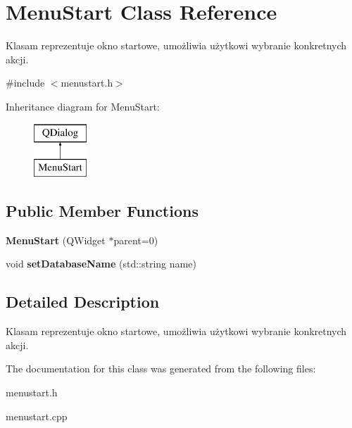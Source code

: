 \hypertarget{class_menu_start}{}\section{Menu\+Start Class Reference}
\label{class_menu_start}


Klasam reprezentuje okno startowe, umożliwia użytkowi wybranie konkretnych akcji.  




{\ttfamily \#include $<$menustart.\+h$>$}

Inheritance diagram for Menu\+Start\+:\begin{figure}[H]
\begin{center}
\leavevmode
\includegraphics[height=2.000000cm]{class_menu_start}
\end{center}
\end{figure}
\subsection*{Public Member Functions}
\begin{DoxyCompactItemize}
\item 
\mbox{\label{class_menu_start_a184ff65bb2534378670fee22487b02eb}} 
{\bfseries Menu\+Start} (Q\+Widget $\ast$parent=0)
\item 
\mbox{\label{class_menu_start_a52634af21c3f1c8fc71c202d9618dab3}} 
void {\bfseries set\+Database\+Name} (std\+::string name)
\end{DoxyCompactItemize}


\subsection{Detailed Description}
Klasam reprezentuje okno startowe, umożliwia użytkowi wybranie konkretnych akcji. 

The documentation for this class was generated from the following files\+:\begin{DoxyCompactItemize}
\item 
menustart.\+h\item 
menustart.\+cpp\end{DoxyCompactItemize}
